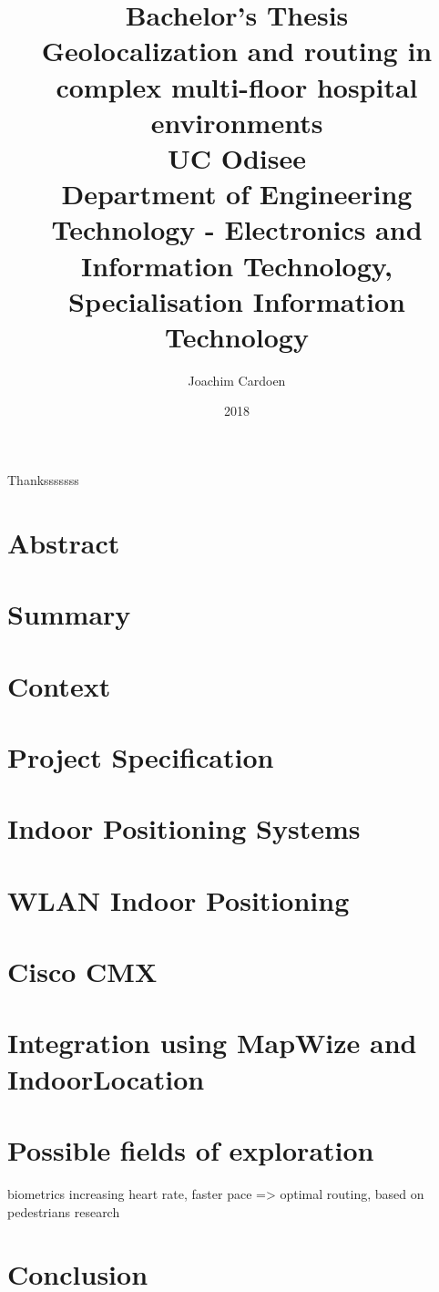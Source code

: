 \documentclass[11pt,twoside]{report}
\title{
    {\large Bachelor's Thesis}\\
    {Geolocalization and routing in complex multi-floor hospital environments}\\
    {\large UC Odisee}\\
    {\large Department of Engineering Technology - Electronics and Information Technology, Specialisation Information Technology}
}
\author{Joachim Cardoen}
\date{2018}
\begin{document}
\begin{titlepage}
\maketitle
\end{titlepage}
\begin{center}
Thanksssssss
\end{center}
\chapter*{Abstract}
\tableofcontents
\clearpage
\printglossary[type=\acronymtype]
\printglossary
\chapter{Summary}
\chapter{Context}
\chapter{Project Specification}

\chapter{Indoor Positioning Systems}

\chapter{WLAN Indoor Positioning}

\chapter{Cisco CMX}

\chapter{Integration using MapWize and IndoorLocation}

\chapter{Possible fields of exploration}
biometrics
increasing heart rate, faster pace => optimal routing, based on pedestrians research
\chapter{Conclusion}


\newpage
\printbibliography
\end{document}
